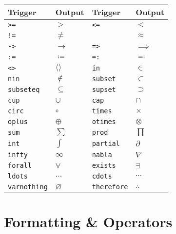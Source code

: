 \documentclass{article}
\newcommand{\snippet}[1]{\textcolor{titlebg}{\texttt{#1}}}
\begin{document}
\begin{tcolorbox}[colback=red!5!white,colframe=red!75!black,title=Mathematical Symbols]
\begin{tabularx}{\textwidth}{lXlX}
\textbf{Trigger} & \textbf{Output} & \textbf{Trigger} & \textbf{Output} \\
\hline
\snippet{>=} & \(\geq\) & \snippet{<=} & \(\leq\) \\
\snippet{!=} & \(\neq\) & \snippet{~~} & \(\approx\) \\
\snippet{->} & \(\to\) & \snippet{=>} & \(\implies\) \\
\snippet{:=} & \(\coloneqq\) & \snippet{=:} & \(\eqqcolon\) \\
\snippet{<>} & \(\langle\rangle\) & \snippet{in} & \(\in\) \\
\snippet{nin} & \(\notin\) & \snippet{subset} & \(\subset\) \\
\snippet{subseteq} & \(\subseteq\) & \snippet{supset} & \(\supset\) \\
\snippet{cup} & \(\cup\) & \snippet{cap} & \(\cap\) \\
\snippet{circ} & \(\circ\) & \snippet{times} & \(\times\) \\
\snippet{oplus} & \(\oplus\) & \snippet{otimes} & \(\otimes\) \\
\snippet{sum} & \(\sum\) & \snippet{prod} & \(\prod\) \\
\snippet{int} & \(\int\) & \snippet{partial} & \(\partial\) \\
\snippet{infty} & \(\infty\) & \snippet{nabla} & \(\nabla\) \\
\snippet{forall} & \(\forall\) & \snippet{exists} & \(\exists\) \\
\snippet{ldots} & \(\dots\) & \snippet{cdots} & \(\cdots\) \\
\snippet{varnothing} & \(\varnothing\) & \snippet{therefore} & \(\therefore\) \\
\end{tabularx}
\end{tcolorbox}

\section{Formatting \& Operators}
\end{document}
